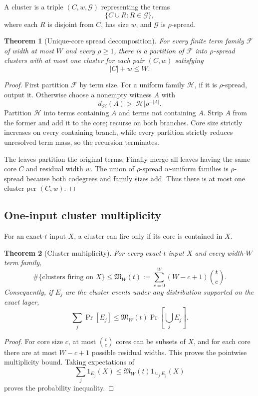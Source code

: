 \documentclass[11pt]{article}
\newtheorem{theorem}{Theorem}
\begin{document}
A cluster is a triple $(C,w,\mathcal G)$ representing the terms
\[
\{C\cup R:R\in\mathcal G\},
\]
where each $R$ is disjoint from $C$, has size $w$, and $\mathcal G$ is $\rho$-spread.

\begin{theorem}[Unique-core spread decomposition]
For every finite term family $\mathcal F$ of width at most $W$ and every $\rho\ge1$, there is a partition of $\mathcal F$ into $\rho$-spread clusters with at most one cluster for each pair $(C,w)$ satisfying
\[
|C|+w\le W.
\]
\end{theorem}
\begin{proof}
First partition $\mathcal F$ by term size. For a uniform family $\mathcal H$, if it is $\rho$-spread, output it. Otherwise choose a nonempty witness $A$ with
\[
d_{\mathcal H}(A)>|\mathcal H|\rho^{-|A|}.
\]
Partition $\mathcal H$ into terms containing $A$ and terms not containing $A$. Strip $A$ from the former and add it to the core; recurse on both branches. Core size strictly increases on every containing branch, while every partition strictly reduces unresolved term mass, so the recursion terminates.

The leaves partition the original terms. Finally merge all leaves having the same core $C$ and residual width $w$. The union of $\rho$-spread $w$-uniform families is $\rho$-spread because both codegrees and family sizes add. Thus there is at most one cluster per $(C,w)$.
\end{proof}

\subsection{One-input cluster multiplicity}
For an exact-$t$ input $X$, a cluster can fire only if its core is contained in $X$.

\begin{theorem}[Cluster multiplicity]
For every exact-$t$ input $X$ and every width-$W$ term family,
\[
\#\{\text{clusters firing on }X\}
\le
\mathfrak M_W(t)
:=
\sum_{c=0}^W (W-c+1)\binom tc.
\]
Consequently, if $E_j$ are the cluster events under any distribution supported on the exact layer,
\[
\sum_j\Pr[E_j]\le \mathfrak M_W(t)\Pr\!\left[\bigcup_jE_j\right].
\]
\end{theorem}
\begin{proof}
For core size $c$, at most $\binom tc$ cores can be subsets of $X$, and for each core there are at most $W-c+1$ possible residual widths. This proves the pointwise multiplicity bound. Taking expectations of
\[
\sum_j1_{E_j}(X)\le \mathfrak M_W(t)1_{\cup_jE_j}(X)
\]
proves the probability inequality.
\end{proof}
\end{document}
